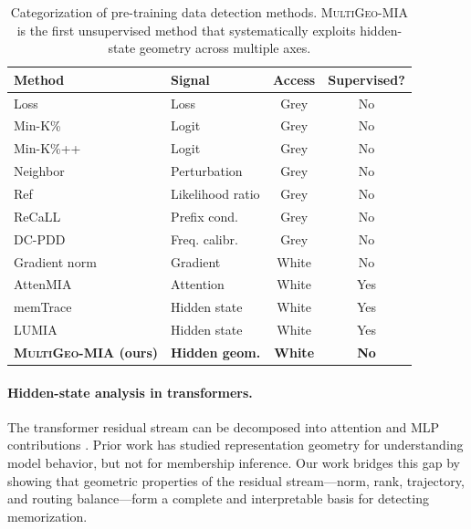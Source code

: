 \documentclass[11pt]{article}
\newcommand{\ours}{\textsc{MultiGeo-MIA}}
\begin{document}
\begin{table}[t]
\centering
\small
\begin{tabular}{@{}llcc@{}}
\toprule
\textbf{Method} & \textbf{Signal} & \textbf{Access} & \textbf{Supervised?} \\
\midrule
Loss \citep{yeom2018privacy} & Loss & Grey & No \\
Min-K\% \citep{shi2024detecting} & Logit & Grey & No \\
Min-K\%++ \citep{zhang2024minkpp} & Logit & Grey & No \\
Neighbor \citep{mattern2023neighbor} & Perturbation & Grey & No \\
Ref \citep{carlini2021extracting} & Likelihood ratio & Grey & No \\
ReCaLL \citep{xie2024recall} & Prefix cond. & Grey & No \\
DC-PDD \citep{zhang2024dcpdd} & Freq. calibr. & Grey & No \\
\midrule
Gradient norm & Gradient & White & No \\
AttenMIA \citep{wang2025attenmia} & Attention & White & Yes \\
memTrace \citep{makhija2025memtrace} & Hidden state & White & Yes \\
LUMIA \citep{ibanez2024lumia} & Hidden state & White & Yes \\
\midrule
\textbf{\ours{} (ours)} & \textbf{Hidden geom.} & \textbf{White} & \textbf{No} \\
\bottomrule
\end{tabular}
\caption{Categorization of pre-training data detection methods. \ours{} is the first unsupervised method that systematically exploits hidden-state geometry across multiple axes.}
\label{tab:related_work}
\end{table}

\paragraph{Hidden-state analysis in transformers.}
The transformer residual stream can be decomposed into attention and MLP contributions \citep{elhage2021mathematical}.
Prior work has studied representation geometry for understanding model behavior, but not for membership inference.
Our work bridges this gap by showing that geometric properties of the residual stream---norm, rank, trajectory, and routing balance---form a complete and interpretable basis for detecting memorization.

\end{document}
